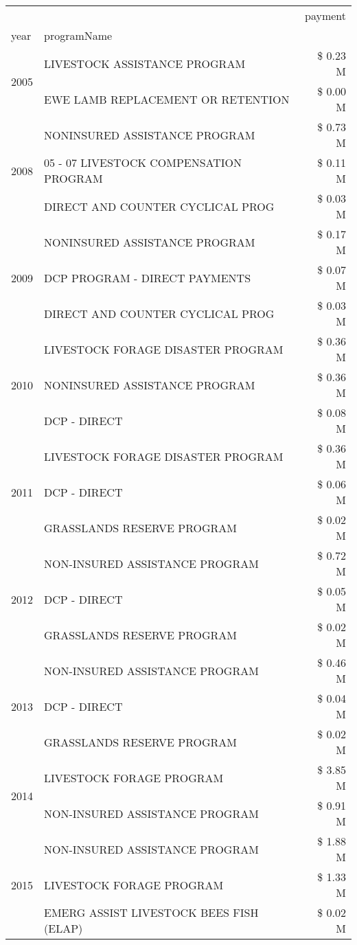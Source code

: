 \begin{tabular}{llr}
\toprule
 &  & payment \\
year & programName &  \\
\midrule
\multirow[t]{2}{*}{2005} & LIVESTOCK ASSISTANCE PROGRAM & \$ 0.23 M \\
 & EWE LAMB REPLACEMENT OR RETENTION & \$ 0.00 M \\
\cline{1-3}
\multirow[t]{3}{*}{2008} & NONINSURED ASSISTANCE PROGRAM & \$ 0.73 M \\
 & 05 - 07 LIVESTOCK COMPENSATION PROGRAM & \$ 0.11 M \\
 & DIRECT AND COUNTER CYCLICAL PROG & \$ 0.03 M \\
\cline{1-3}
\multirow[t]{3}{*}{2009} & NONINSURED ASSISTANCE PROGRAM & \$ 0.17 M \\
 & DCP PROGRAM - DIRECT PAYMENTS & \$ 0.07 M \\
 & DIRECT AND COUNTER CYCLICAL PROG & \$ 0.03 M \\
\cline{1-3}
\multirow[t]{3}{*}{2010} & LIVESTOCK FORAGE DISASTER PROGRAM & \$ 0.36 M \\
 & NONINSURED ASSISTANCE PROGRAM & \$ 0.36 M \\
 & DCP - DIRECT & \$ 0.08 M \\
\cline{1-3}
\multirow[t]{3}{*}{2011} & LIVESTOCK FORAGE DISASTER PROGRAM & \$ 0.36 M \\
 & DCP - DIRECT & \$ 0.06 M \\
 & GRASSLANDS RESERVE PROGRAM & \$ 0.02 M \\
\cline{1-3}
\multirow[t]{3}{*}{2012} & NON-INSURED ASSISTANCE PROGRAM & \$ 0.72 M \\
 & DCP - DIRECT & \$ 0.05 M \\
 & GRASSLANDS RESERVE PROGRAM & \$ 0.02 M \\
\cline{1-3}
\multirow[t]{3}{*}{2013} & NON-INSURED ASSISTANCE PROGRAM & \$ 0.46 M \\
 & DCP - DIRECT & \$ 0.04 M \\
 & GRASSLANDS RESERVE PROGRAM & \$ 0.02 M \\
\cline{1-3}
\multirow[t]{2}{*}{2014} & LIVESTOCK FORAGE PROGRAM & \$ 3.85 M \\
 & NON-INSURED ASSISTANCE PROGRAM & \$ 0.91 M \\
\cline{1-3}
\multirow[t]{3}{*}{2015} & NON-INSURED ASSISTANCE PROGRAM & \$ 1.88 M \\
 & LIVESTOCK FORAGE PROGRAM & \$ 1.33 M \\
 & EMERG ASSIST LIVESTOCK BEES FISH (ELAP) & \$ 0.02 M \\

\end{tabular}
